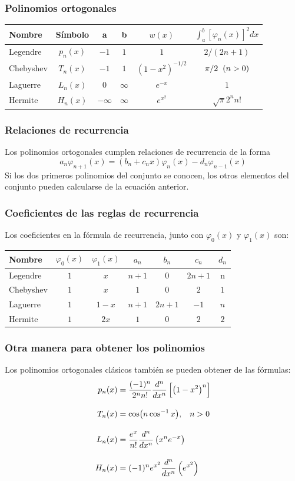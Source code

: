 \begin{frame}
\frametitle{Polinomios ortogonales}
\fontsize{12}{12}\selectfont
\begin{tabular}{| l | c | c | c | c | c |}
\hline
Nombre & Símbolo & a & b & $w(x)$ & $\int_{a}^{b} \left[ \varphi_{n} (x)\right]^{2} dx $ \\ \hline
Legendre & $p_{n}(x)$ & $-1$ & $1$ & $1$ & $2/(2n+1)$ \\
Chebyshev & $T_{n}(x)$ & $-1$ & $1$ & $(1-x^{2})^{-1/2}$ & $\pi/2 \hspace{0.2cm} (n>0)$ \\
Laguerre & $L_{n}(x)$ & $0$ & $\infty$ & $e^{-x}$ & $1$ \\
Hermite & $H_{n}(x)$ & $-\infty$ & $\infty$ & $e^{x^{2}}$ & $\sqrt{\pi} 2^{n} n!$ \\ \hline
\end{tabular}
\end{frame}
\begin{frame}
\frametitle{Relaciones de recurrencia}
Los polinomios ortogonales cumplen relaciones de recurrencia de la forma
\[ a_{n} \varphi_{n+1} (x) = (b_{n} + c_{n} x) \varphi_{n} (x) - d_{n} \varphi_{n-1} (x)  \]
Si los dos primeros polinomios del conjunto se conocen, los otros elementos del conjunto pueden calcularse de la ecuación anterior. 
\end{frame}
\begin{frame}
\frametitle{Coeficientes de las reglas de recurrencia}
Los coeficientes en la fórmula de recurrencia, junto con $\varphi_{0}(x)$ y $\varphi_{1}(x)$ son:
\fontsize{12}{12}\selectfont
\begin{tabular}{| l | c | c | c | c | c | c |}
\hline
Nombre & $\varphi_{0}(x)$ & $\varphi_{1}(x)$ & $a_{n}$ & $b_{n}$ & $c_{n}$ & $d_{n}$ \\ \hline
Legendre & $1$ & $x$ & $n+1$ & $0$ & $2n+1$ & n \\
Chebyshev & $1$ & $x$ & $1$ & $0$ & $2$ & $1$ \\
Laguerre & $1$ & $1-x$ & $n+1$ & $2n+1$ & $-1$ & $n$ \\
Hermite & $1$ & $2x$ & $1$ & $0$ & $2$ & $2$ \\ \hline
\end{tabular}
\end{frame}
\begin{frame}
\frametitle{Otra manera para obtener los polinomios}
Los polinomios ortogonales clásicos también se pueden obtener de las fórmulas:
\begin{align*}
p_{n}(x) &= \dfrac{(-1)^{n}}{2^{n}n!} \dfrac{d^{n}}{dx^{n}} \left[ \left( 1-x^{2} \right)^{n} \right] \\[1em]
T_{n}(x) &= \cos(n\cos^{-1}x), \hspace{0.3cm} n>0 \\[1em]
L_{n}(x) &= \dfrac{e^{x}}{n!} \dfrac{d^{n}}{dx^{n}} \left( x^{n} e^{-x} \right) \\[1em]
H_{n}(x) &= (-1)^{n} e^{x^{2}} \dfrac{d^{n}}{dx^{n}} \left(e^{x^{2}} \right)
\end{align*}
\end{frame}
